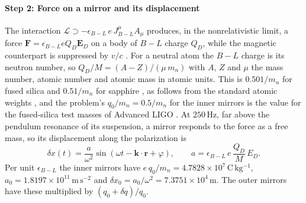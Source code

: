 \paragraph*{Step 2: Force on a mirror and its displacement}
The interaction $\mathcal L\supset-\epsilon_{B-L}\,e\,J^\mu_{B-L}A_\mu$ produces, in the nonrelativistic limit, a force $\mathbf F=\epsilon_{B-L}eQ_D\mathbf E_D$ on a body of $B-L$ charge $Q_D$, while the magnetic counterpart is suppressed by $v/c$ \citep{Pierce2018}. For a neutral atom the $B-L$ charge is its neutron number, so $Q_D/M=(A-Z)/(\mu\,m_n)$ with $A$, $Z$ and $\mu$ the mass number, atomic number and atomic mass in atomic units. This is $0.501/m_n$ for fused silica and $0.51/m_n$ for sapphire \citep{Michimura2020}, as follows from the standard atomic weights \citep{Prohaska2022}, and the problem's $q_0/m_n=0.5/m_n$ for the inner mirrors is the value for the fused-silica test masses of Advanced LIGO \citep{Aasi2015}. At $250\,\mathrm{Hz}$, far above the pendulum resonance of its suspension, a mirror responds to the force as a free mass, so its displacement along the polarization is
%
\begin{equation}
\delta x(t)=\frac{a}{\omega^2}\sin(\omega t-\mathbf k\cdot\mathbf r+\varphi),\qquad a=\epsilon_{B-L}\,e\,\frac{Q_D}{M}\,E_D .
\label{eq:dx}
\end{equation}
%
Per unit $\epsilon_{B-L}$ the inner mirrors have $e\,q_0/m_n=4.7828\times10^{7}\,\mathrm{C\,kg^{-1}}$, $a_0=1.8197\times10^{11}\,\mathrm{m\,s^{-2}}$ and $\delta x_0=a_0/\omega^2=7.3751\times10^{4}\,\mathrm{m}$. The outer mirrors have these multiplied by $(q_0+\delta q)/q_0$.

